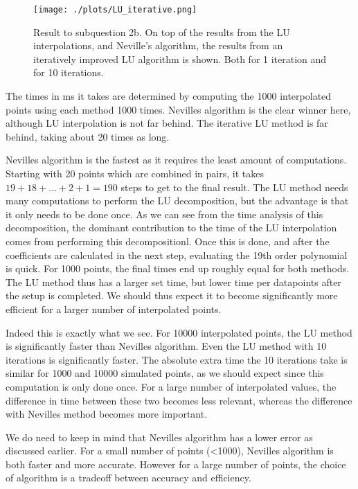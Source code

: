 \begin{figure}[h!]
  \centering
  \texttt{[image: ./plots/LU\_iterative.png]}
  \caption{Result to subquestion 2b. On top of the results from the LU interpolations, and Neville's algorithm, the results from an iteratively improved LU algorithm is shown. Both for 1 iteration and for 10 iterations.}
  \label{fig:LU_iterative}
\end{figure}

The times in ms it takes are determined by computing the 1000 interpolated points using each method 1000 times. Nevilles algorithm is the clear winner here, although LU interpolation is not far behind. The iterative LU method is far behind, taking about 20 times as long.

Nevilles algorithm is the fastest as it requires the least amount of computations. Starting with 20 points which are combined in pairs, it takes $19+18+...+2+1=190$ steps to get to the final result. The LU method needs many computations to perform the LU decomposition, but the advantage is that it only needs to be done once. As we can see from the time analysis of this decomposition, the dominant contribution to the time of the LU interpolation comes from performing this decompositionl. Once this is done, and after the coefficients are calculated in the next step, evaluating the 19th order polynomial is quick. For 1000 points, the final times end up roughly equal for both methods. The LU method thus has a larger set time, but lower time per datapoints after the setup is completed. We should thus expect it to become significantly more efficient for a larger number of interpolated points.

Indeed this is exactly what we see. For 10000 interpolated points, the LU method is significantly faster than Nevilles algorithm. Even the LU method with 10 iterations is significantly faster. The absolute extra time the 10 iterations take is similar for 1000 and 10000 simulated points, as we should expect since this computation is only done once. For a large number of interpolated values, the difference in time between these two becomes less relevant, whereas the difference with Nevilles method becomes more important.

We do need to keep in mind that Nevilles algorithm has a lower error as discussed earlier. For a small number of points (<1000), Nevilles algorithm is both faster and more accurate. However for a large number of points, the choice of algorithm is a tradeoff between accuracy and efficiency.



